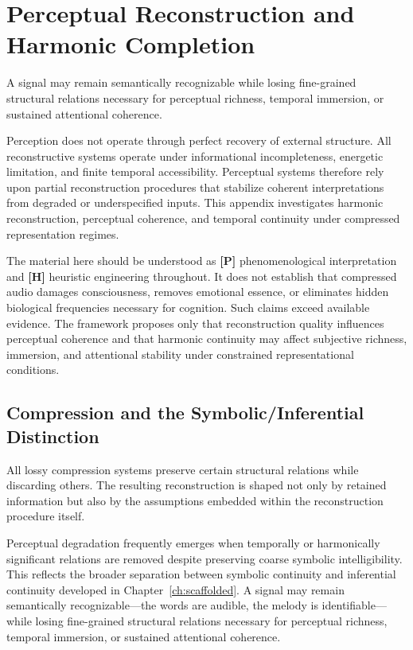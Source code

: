 \chapter{Perceptual Reconstruction and Harmonic Completion}
\label{app:perceptual}

\epigraph{A signal may remain semantically recognizable while losing fine-grained
structural relations necessary for perceptual richness, temporal immersion, or
sustained attentional coherence.}{}

\noindent Perception does not operate through perfect recovery of external
structure. All reconstructive systems operate under informational incompleteness,
energetic limitation, and finite temporal accessibility. Perceptual systems
therefore rely upon partial reconstruction procedures that stabilize coherent
interpretations from degraded or underspecified inputs. This appendix investigates
harmonic reconstruction, perceptual coherence, and temporal continuity under
compressed representation regimes.

The material here should be understood as \textbf{[P]} phenomenological
interpretation and \textbf{[H]} heuristic engineering throughout. It does not
establish that compressed audio damages consciousness, removes emotional essence,
or eliminates hidden biological frequencies necessary for cognition. Such claims
exceed available evidence. The framework proposes only that reconstruction quality
influences perceptual coherence and that harmonic continuity may affect subjective
richness, immersion, and attentional stability under constrained representational
conditions.

\section{Compression and the Symbolic/Inferential Distinction}

All lossy compression systems preserve certain structural relations while discarding
others. The resulting reconstruction is shaped not only by retained information but
also by the assumptions embedded within the reconstruction procedure itself.

Perceptual degradation frequently emerges when temporally or harmonically significant
relations are removed despite preserving coarse symbolic intelligibility. This
reflects the broader separation between symbolic continuity and inferential
continuity developed in Chapter~\ref{ch:scaffolded}. A signal may remain
semantically recognizable---the words are audible, the melody is identifiable---
while losing fine-grained structural relations necessary for perceptual richness,
temporal immersion, or sustained attentional coherence.

